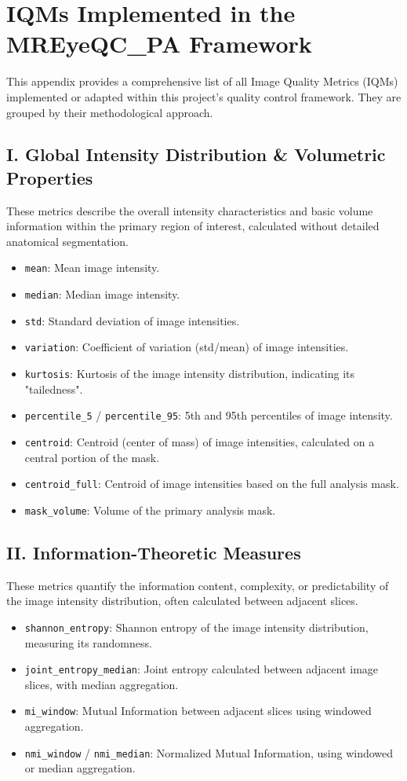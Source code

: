 \chapter{IQMs Implemented in the MREyeQC\_PA Framework}
\label{app:IQM}
\minitoc

This appendix provides a comprehensive list of all Image Quality Metrics (IQMs) implemented or adapted within this project's quality control framework. They are grouped by their methodological approach.

\section*{I. Global Intensity Distribution \& Volumetric Properties}
These metrics describe the overall intensity characteristics and basic volume information within the primary region of interest, calculated without detailed anatomical segmentation.
\begin{itemize}
    \item \texttt{mean}: Mean image intensity.
    \item \texttt{median}: Median image intensity.
    \item \texttt{std}: Standard deviation of image intensities.
    \item \texttt{variation}: Coefficient of variation (std/mean) of image intensities.
    \item \texttt{kurtosis}: Kurtosis of the image intensity distribution, indicating its "tailedness".
    \item \texttt{percentile\_5} / \texttt{percentile\_95}: 5th and 95th percentiles of image intensity.
    \item \texttt{centroid}: Centroid (center of mass) of image intensities, calculated on a central portion of the mask.
    \item \texttt{centroid\_full}: Centroid of image intensities based on the full analysis mask.
    \item \texttt{mask\_volume}: Volume of the primary analysis mask.
\end{itemize}

\section*{II. Information-Theoretic Measures}
These metrics quantify the information content, complexity, or predictability of the image intensity distribution, often calculated between adjacent slices.
\begin{itemize}
    \item \texttt{shannon\_entropy}: Shannon entropy of the image intensity distribution, measuring its randomness.
    \item \texttt{joint\_entropy\_median}: Joint entropy calculated between adjacent image slices, with median aggregation.
    \item \texttt{mi\_window}: Mutual Information between adjacent slices using windowed aggregation.
    \item \texttt{nmi\_window} / \texttt{nmi\_median}: Normalized Mutual Information, using windowed or median aggregation.
\end{itemize}

